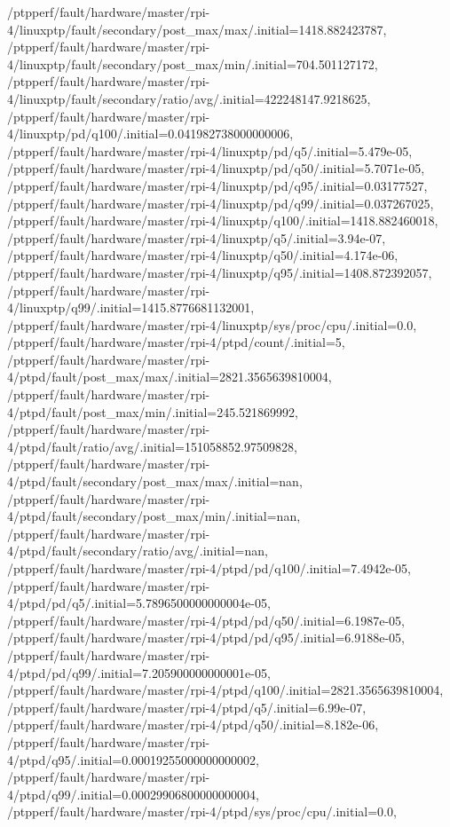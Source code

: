 {    /ptpperf/fault/hardware/master/rpi-4/linuxptp/fault/secondary/post_max/max/.initial=1418.882423787,
    /ptpperf/fault/hardware/master/rpi-4/linuxptp/fault/secondary/post_max/min/.initial=704.501127172,
    /ptpperf/fault/hardware/master/rpi-4/linuxptp/fault/secondary/ratio/avg/.initial=422248147.9218625,
    /ptpperf/fault/hardware/master/rpi-4/linuxptp/pd/q100/.initial=0.041982738000000006,
    /ptpperf/fault/hardware/master/rpi-4/linuxptp/pd/q5/.initial=5.479e-05,
    /ptpperf/fault/hardware/master/rpi-4/linuxptp/pd/q50/.initial=5.7071e-05,
    /ptpperf/fault/hardware/master/rpi-4/linuxptp/pd/q95/.initial=0.03177527,
    /ptpperf/fault/hardware/master/rpi-4/linuxptp/pd/q99/.initial=0.037267025,
    /ptpperf/fault/hardware/master/rpi-4/linuxptp/q100/.initial=1418.882460018,
    /ptpperf/fault/hardware/master/rpi-4/linuxptp/q5/.initial=3.94e-07,
    /ptpperf/fault/hardware/master/rpi-4/linuxptp/q50/.initial=4.174e-06,
    /ptpperf/fault/hardware/master/rpi-4/linuxptp/q95/.initial=1408.872392057,
    /ptpperf/fault/hardware/master/rpi-4/linuxptp/q99/.initial=1415.8776681132001,
    /ptpperf/fault/hardware/master/rpi-4/linuxptp/sys/proc/cpu/.initial=0.0,
    /ptpperf/fault/hardware/master/rpi-4/ptpd/count/.initial=5,
    /ptpperf/fault/hardware/master/rpi-4/ptpd/fault/post_max/max/.initial=2821.3565639810004,
    /ptpperf/fault/hardware/master/rpi-4/ptpd/fault/post_max/min/.initial=245.521869992,
    /ptpperf/fault/hardware/master/rpi-4/ptpd/fault/ratio/avg/.initial=151058852.97509828,
    /ptpperf/fault/hardware/master/rpi-4/ptpd/fault/secondary/post_max/max/.initial=nan,
    /ptpperf/fault/hardware/master/rpi-4/ptpd/fault/secondary/post_max/min/.initial=nan,
    /ptpperf/fault/hardware/master/rpi-4/ptpd/fault/secondary/ratio/avg/.initial=nan,
    /ptpperf/fault/hardware/master/rpi-4/ptpd/pd/q100/.initial=7.4942e-05,
    /ptpperf/fault/hardware/master/rpi-4/ptpd/pd/q5/.initial=5.7896500000000004e-05,
    /ptpperf/fault/hardware/master/rpi-4/ptpd/pd/q50/.initial=6.1987e-05,
    /ptpperf/fault/hardware/master/rpi-4/ptpd/pd/q95/.initial=6.9188e-05,
    /ptpperf/fault/hardware/master/rpi-4/ptpd/pd/q99/.initial=7.205900000000001e-05,
    /ptpperf/fault/hardware/master/rpi-4/ptpd/q100/.initial=2821.3565639810004,
    /ptpperf/fault/hardware/master/rpi-4/ptpd/q5/.initial=6.99e-07,
    /ptpperf/fault/hardware/master/rpi-4/ptpd/q50/.initial=8.182e-06,
    /ptpperf/fault/hardware/master/rpi-4/ptpd/q95/.initial=0.00019255000000000002,
    /ptpperf/fault/hardware/master/rpi-4/ptpd/q99/.initial=0.00029906800000000004,
    /ptpperf/fault/hardware/master/rpi-4/ptpd/sys/proc/cpu/.initial=0.0,
}
